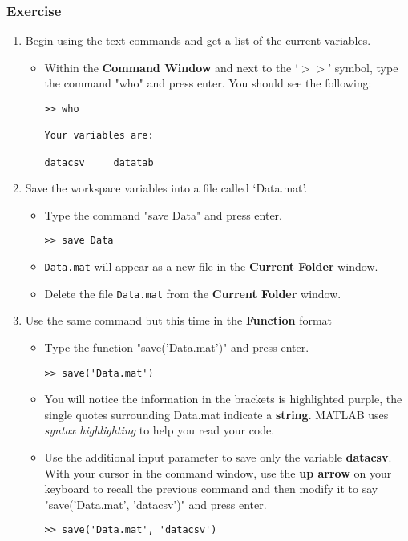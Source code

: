 \documentclass[12pt,a4paper]{article}
\begin{document}
\subsubsection*{Exercise}
\begin{enumerate}
	\item Begin using the text commands and get a list of the current variables.
	\begin{itemize}
		\item Within the \textbf{Command Window} and next to the `$>>$' symbol, type the command "who" and press enter.	You should see the following:
		\begin{lstlisting}[style=Matlab-editor]
>> who
		
Your variables are:
		
datacsv 	datatab
		\end{lstlisting}	
		
	\end{itemize}
	\item Save the workspace variables into a file called `Data.mat'.  
    	\begin{itemize}	
    		\item Type the command "save Data" and press enter.
    		\begin{lstlisting}[style=Matlab-editor]
    >> save Data
    		\end{lstlisting}	
    		\item \texttt{Data.mat} will appear as a new file in the \textbf{Current Folder} window.
    		\item Delete the file \texttt{Data.mat} from the \textbf{Current Folder} window.
    	\end{itemize}
	\item Use the same command but this time in the \textbf{Function} format
    	\begin{itemize}	
    		\item Type the function "save('Data.mat')" and press enter.
    		\begin{lstlisting}[style=Matlab-editor]
    >> save('Data.mat')
    		\end{lstlisting}	
    		\item You will notice the information in the brackets is highlighted purple, the single quotes surrounding Data.mat indicate a \textbf{string}. MATLAB uses \emph{syntax highlighting} to help you read your code.	
    		\item Use the additional input parameter to save only the variable \textbf{datacsv}.  With your cursor in the command window, use the \textbf{up arrow} on your keyboard to recall the previous command and then modify it to say "save('Data.mat', 'datacsv')" and press enter.\\
    		\begin{lstlisting}[style=Matlab-editor]
    >> save('Data.mat', 'datacsv')
    		\end{lstlisting}	
    	\end{itemize}	
	

\end{enumerate}
\end{document}
